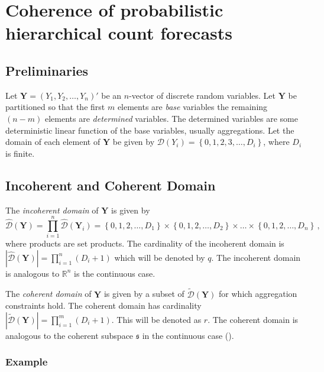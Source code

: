 \documentclass[a4paper,review,12pt,authoryear]{elsarticle}
\newcommand{\bY}{\mathbf{Y}}
\begin{document}
\section{Coherence of probabilistic hierarchical count forecasts}

\label{sec:coherence}

	\subsection{Preliminaries}
	Let $\bY=\left(Y_1,Y_2,\ldots,Y_n\right)'$ be an $n$-vector of discrete random variables.
  Let $\bY$ be partitioned so that the first $m$ elements are \textit{base} variables the remaining $(n-m)$ elements are \textit{determined} variables.
  The determined variables are some deterministic linear function of the base variables, usually aggregations. 
  Let the domain of each element of $\bY$ be given by $\mathcal{D}(Y_i)=\left\{0, 1,2,3,\dots,D_i\right\}$, where $D_i$ is finite.
	
	\subsection{Incoherent and Coherent Domain}
	The \textit{incoherent domain} of $\bY$ is given by
	\[
	\hat{\mathcal D}(\bY)=\prod\limits_{i=1}^n\hat{\mathcal D}(\bY_i)=\left\{0, 1,2,\dots,D_1\right\}\times\left\{0,1,2,\dots,D_2\right\}\times\dots\times\left\{0,1,2,\dots,D_n\right\}\,,
	\] 
  where products are set products. The cardinality of the incoherent domain is $|\hat{\mathcal D}(\bY)|=\prod\limits_{i=1}^{n} (D_i+1)$ which will be denoted by $q$. 
  The incoherent domain is analogous to $\mathbb{R}^n$ is the continuous case.
    
  The \textit{coherent domain} of $\bY$ is given by a subset of $\tilde{\mathcal D}(\bY)$ for which aggregation constraints hold.  
  The coherent domain has cardinality $|\tilde{\mathcal D}(\bY)|=\prod\limits_{i=1}^{m} (D_i+1)$. This will be denoted as $r$. 
  The coherent domain is analogous to the coherent subspace $\mathfrak{s}$ in the continuous case (\citealp{panagiotelisProbabilisticForecastReconciliation2022}).
    
    \subsubsection*{Example}
    \label{sec:example}
    
\end{document}

